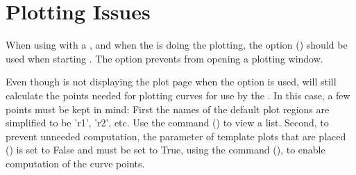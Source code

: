\section{Plotting Issues}
\label{s:gui.plot}

When using \tao with a , and when the  is doing the plotting, the 
option () should be used when starting \tao. The  option prevents
\tao from opening a plotting window.

Even though \tao is not displaying the plot page when the  option is used, \tao will
still calculate the points needed for plotting curves for use by the . In this case, a few
points must be kept in mind: First the names of the default plot regions are simplified to be 'r1',
'r2', etc. Use the  command () to view a list. Second, to prevent
unneeded computation, the  parameter of template plots that are placed ()
is set to False and must be set to True, using the  command (), to
enable computation of the curve points.
